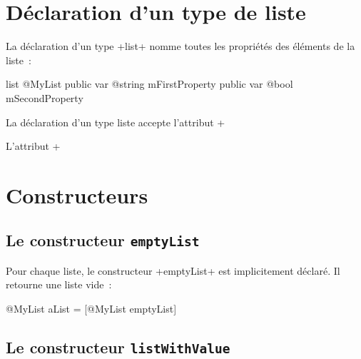



\section{Déclaration d'un type de liste}

La déclaration d'un type \ggs+list+ nomme toutes les propriétés des éléments de la liste~:

\begin{galgas}
list @MyList {
  public var @string mFirstProperty
  public var @bool mSecondProperty
}
\end{galgas}

La déclaration d'un type liste accepte l'attribut \ggs+%

L'attribut \ggs+%

\section{Constructeurs}

\subsection{Le constructeur \texttt{emptyList}}

Pour chaque liste, le constructeur \ggs+emptyList+ est implicitement déclaré. Il retourne une liste vide~:

\begin{galgas}
@MyList aList = [@MyList emptyList]
\end{galgas}


\subsection{Le constructeur \texttt{listWithValue}}

